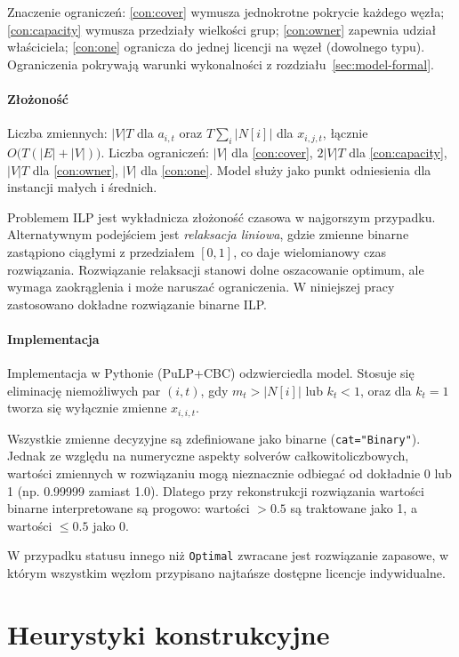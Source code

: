 Znaczenie ograniczeń: \eqref{con:cover} wymusza jednokrotne pokrycie każdego węzła; \eqref{con:capacity} wymusza przedziały wielkości grup; \eqref{con:owner} zapewnia udział właściciela; \eqref{con:one} ogranicza do jednej licencji na węzeł (dowolnego typu). Ograniczenia pokrywają warunki wykonalności z rozdziału~\ref{sec:model-formal}.

\paragraph{Złożoność}
Liczba zmiennych: \(|V|T\) dla \(a_{i,t}\) oraz \(T\sum_i |N[i]|\) dla \(x_{i,j,t}\), łącznie \(O\!\bigl(T(|E|+|V|)\bigr)\).
Liczba ograniczeń: \(|V|\) dla \eqref{con:cover}, \(2|V|T\) dla \eqref{con:capacity}, \(|V|T\) dla \eqref{con:owner}, \(|V|\) dla \eqref{con:one}.
Model służy jako punkt odniesienia dla instancji małych i średnich.

Problemem ILP jest wykładnicza złożoność czasowa w najgorszym przypadku. Alternatywnym podejściem jest \emph{relaksacja liniowa}, gdzie zmienne binarne zastąpiono ciągłymi z przedziałem \([0,1]\), co daje wielomianowy czas rozwiązania. Rozwiązanie relaksacji stanowi dolne oszacowanie optimum, ale wymaga zaokrąglenia i może naruszać ograniczenia. W niniejszej pracy zastosowano dokładne rozwiązanie binarne ILP.

\paragraph{Implementacja}
Implementacja w Pythonie (PuLP+CBC) odzwierciedla model. Stosuje się eliminację niemożliwych par \((i,t)\), gdy \(m_t>|N[i]|\) lub \(k_t<1\), oraz dla \(k_t=1\) tworza się wyłącznie zmienne \(x_{i,i,t}\).

Wszystkie zmienne decyzyjne są zdefiniowane jako binarne (\texttt{cat="Binary"}). Jednak ze względu na numeryczne aspekty solverów całkowitoliczbowych, wartości zmiennych w rozwiązaniu mogą nieznacznie odbiegać od dokładnie 0 lub 1 (np. 0.99999 zamiast 1.0). Dlatego przy rekonstrukcji rozwiązania wartości binarne interpretowane są progowo: wartości \(>0.5\) są traktowane jako 1, a wartości \(\leq 0.5\) jako 0.

W przypadku statusu innego niż \texttt{Optimal} zwracane jest rozwiązanie zapasowe, w którym wszystkim węzłom przypisano najtańsze dostępne licencje indywidualne.

\section{Heurystyki konstrukcyjne}

